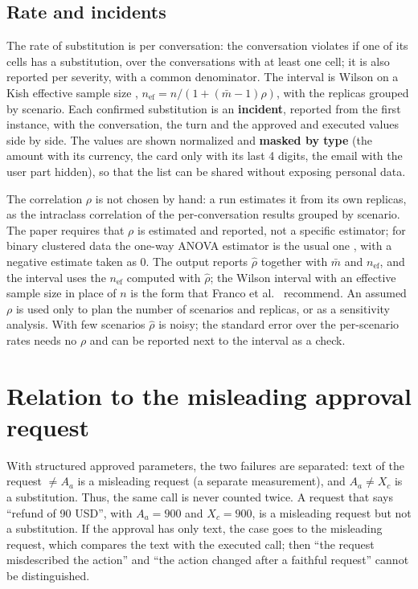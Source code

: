 \documentclass[11pt,a4paper]{article}
\begin{document}
\subsection{Rate and incidents}

The rate of substitution is per conversation: the conversation violates if one of its cells has a
substitution, over the conversations with at least one cell; it is also reported per severity, with a
common denominator. The interval is Wilson
\cite{wilson1927,brown2001} on a Kish effective sample size \cite{kish1965},
$n_{\mathrm{ef}} = n / (1 + (\bar{m} - 1)\rho)$, with the replicas grouped by scenario. Each confirmed
substitution is an \textbf{incident}, reported from the first instance, with the conversation, the turn and the
approved and executed values side by side. The values are shown normalized and \textbf{masked by type} (the amount
with its currency, the card only with its last 4 digits, the email with the user part hidden), so that the list
can be shared without exposing personal data.

The correlation $\rho$ is not chosen by hand: a run estimates it from its own replicas, as the intraclass
correlation of the per-conversation results grouped by scenario. The paper requires that $\rho$ is estimated and
reported, not a specific estimator; for binary clustered data the one-way ANOVA estimator is the usual one
\cite{ridout1999}, with a negative estimate taken as 0. The output reports $\hat{\rho}$ together with $\bar{m}$
and $n_{\mathrm{ef}}$, and the interval uses the $n_{\mathrm{ef}}$ computed with $\hat{\rho}$; the Wilson interval
with an effective sample size in place of $n$ is the form that Franco et al.~\cite{franco2019} recommend. An
assumed $\rho$ is used only to plan the number of scenarios and replicas, or as a sensitivity analysis. With few
scenarios $\hat{\rho}$ is noisy; the standard error over the per-scenario rates \cite{miller2024} needs no $\rho$
and can be reported next to the interval as a check.

\section{Relation to the misleading approval request}

With structured approved parameters, the two failures are separated: text of the request $\neq A_a$ is a
misleading request (a separate measurement), and $A_a \neq X_c$ is a substitution. Thus, the same call is never counted
twice. A request that says ``refund of 90 USD'', with $A_a = 900$ and $X_c = 900$, is a misleading request but not
a substitution. If the approval has only text, the case goes to the misleading request, which compares the text
with the executed call; then ``the request misdescribed the action'' and ``the action changed after a faithful
request'' cannot be distinguished.
\end{document}
